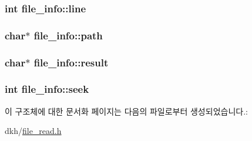 \hypertarget{structfile__info_ab0c900c50eef067aed0a257b218e5396}{
\subsubsection[{line}]{\setlength{\rightskip}{0pt plus 5cm}int file\+\_\+info\+::line}}\label{structfile__info_ab0c900c50eef067aed0a257b218e5396}
\hypertarget{structfile__info_a031658e6d1a3906f23b26a88e05ce6d0}{
\subsubsection[{path}]{\setlength{\rightskip}{0pt plus 5cm}char$\ast$ file\+\_\+info\+::path}}\label{structfile__info_a031658e6d1a3906f23b26a88e05ce6d0}
\hypertarget{structfile__info_a0b17a1cbdb96ab198326c6073c862fe1}{
\subsubsection[{result}]{\setlength{\rightskip}{0pt plus 5cm}char$\ast$ file\+\_\+info\+::result}}\label{structfile__info_a0b17a1cbdb96ab198326c6073c862fe1}
\hypertarget{structfile__info_a8906d485cfe0e1095b3ed0e35c6e7506}{
\subsubsection[{seek}]{\setlength{\rightskip}{0pt plus 5cm}int file\+\_\+info\+::seek}}\label{structfile__info_a8906d485cfe0e1095b3ed0e35c6e7506}


이 구조체에 대한 문서화 페이지는 다음의 파일로부터 생성되었습니다.\+:\begin{DoxyCompactItemize}
\item 
dkh/\hyperlink{file__read_8h}{file\+\_\+read.\+h}\end{DoxyCompactItemize}

